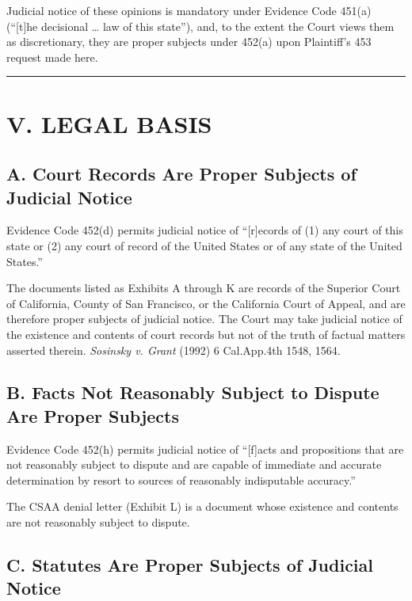 
Judicial notice of these opinions is mandatory under Evidence Code \textsection{} 451(a) (``{[}t{]}he decisional \ldots{} law of this state''), and, to the extent the Court views them as discretionary, they are proper subjects under \textsection{} 452(a) upon Plaintiff's \textsection{} 453 request made here.

\begin{center}\rule{0.5\linewidth}{0.5pt}\end{center}

\section{V. LEGAL BASIS}\label{v.-legal-basis}

\subsection{A. Court Records Are Proper Subjects of Judicial Notice}\label{a.-court-records-are-proper-subjects-of-judicial-notice}

Evidence Code \textsection{} 452(d) permits judicial notice of ``{[}r{]}ecords of (1) any court of this state or (2) any court of record of the United States or of any state of the United States.''

The documents listed as Exhibits A through K are records of the Superior Court of California, County of San Francisco, or the California Court of Appeal, and are therefore proper subjects of judicial notice. The Court may take judicial notice of the existence and contents of court records but not of the truth of factual matters asserted therein. \emph{Sosinsky v. Grant} (1992) 6 Cal.App.4th 1548, 1564.

\subsection{B. Facts Not Reasonably Subject to Dispute Are Proper Subjects}\label{b.-facts-not-reasonably-subject-to-dispute-are-proper-subjects}

Evidence Code \textsection{} 452(h) permits judicial notice of ``{[}f{]}acts and propositions that are not reasonably subject to dispute and are capable of immediate and accurate determination by resort to sources of reasonably indisputable accuracy.''

The CSAA denial letter (Exhibit L) is a document whose existence and contents are not reasonably subject to dispute.

\subsection{C. Statutes Are Proper Subjects of Judicial Notice}\label{c.-statutes-are-proper-subjects-of-judicial-notice}

